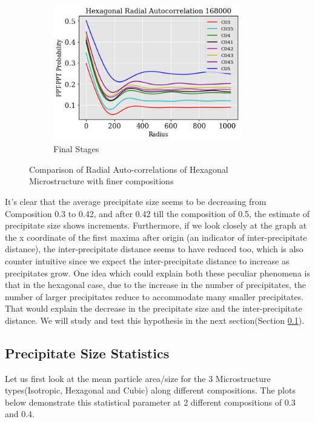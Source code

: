 \documentclass[12pt, a4paper]{report}
\begin{document}
\begin{figure}[H]
\begin{subfigure}{.45\textwidth}
  \centering
  \includegraphics[width=0.9\textwidth]{Pictures/Comparison/Radial Auto comparison/hex_168k_C3453545.png}
  \caption{Final Stages}
  \label{img:microstrImg}
\end{subfigure}
\caption{Comparison of Radial Auto-correlations of Hexagonal Microstructure with finer compositions}
\label{fig:test22}
\end{figure}

It's clear that the average precipitate size seems to be decreasing from Composition 0.3 to 0.42, and after 0.42 till the composition of 0.5, the estimate of precipitate size shows increments. Furthermore, if we look closely at the graph at the x coordinate of the first maxima after origin (an indicator of inter-precipitate distance), the inter-precipitate distance seems to have reduced too, which is also counter intuitive since we expect the inter-precipitate distance to increase as precipitates grow. One idea which could explain both these peculiar phenomena is that in the hexagonal case, due to the increase in the number of precipitates, the number of larger precipitates reduce to accommodate many smaller precipitates. That would explain the decrease in the precipitate size and the inter-precipitate distance. We will study and test this hypothesis in the next section(Section \ref{pptSizeStat}).


\subsection{Precipitate Size Statistics}
\label{pptSizeStat}
Let us first look at the mean particle area/size for the 3 Microstructure types(Isotropic, Hexagonal and Cubic) along different compositions. The plots below demonstrate this statistical parameter at 2 different compositions of 0.3 and 0.4. 
\end{document}
